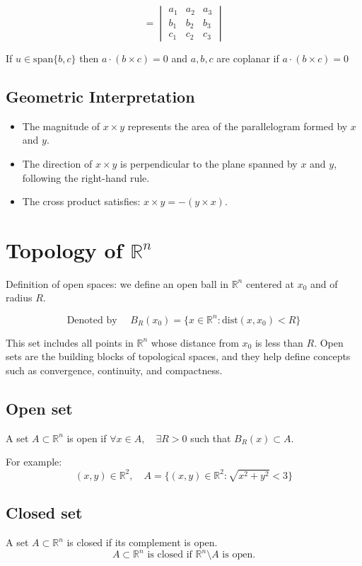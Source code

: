 \documentclass[11pt]{article}
\begin{document}
\[
= \begin{vmatrix}
a_1 & a_2 & a_3 \\
b_1 & b_2 & b_3 \\
c_1 & c_2 & c_3
\end{vmatrix}
\]

If $u \in \text{span}\{b, c\}$ then $a \cdot (b \times c) = 0$ and $a, b, c$ are coplanar if $a \cdot (b \times c) = 0$

\subsection{Geometric Interpretation}
\begin{itemize}
    \item The magnitude of $x \times y$ represents the area of the parallelogram formed by $x$ and $y$.
    \item The direction of $x \times y$ is perpendicular to the plane spanned by $x$ and $y$, following the right-hand rule.
    \item The cross product satisfies: $x \times y = - (y \times x)$.
\end{itemize}

\section{Topology of $\mathbb{R}^n$}

Definition of open spaces: we define an open ball in $\mathbb{R}^n$ centered at $x_0$ and of radius $R$.

\[
\text{Denoted by } \quad B_R(x_0) = \{ x \in \mathbb{R}^n : \text{dist}(x, x_0) < R \}
\]

This set includes all points in $\mathbb{R}^n$ whose distance from $x_0$ is less than $R$. Open sets are the building blocks of topological spaces, and they help define concepts such as convergence, continuity, and compactness.

\subsection{Open set}
A set $A \subset \mathbb{R}^n$ is open if $\forall x \in A, \quad \exists R > 0$ such that $B_R(x) \subset A$.

For example:
\[
(x,y) \in \mathbb{R}^2, \quad A = \{ (x,y) \in \mathbb{R}^2 : \sqrt{x^2 + y^2} < 3 \}
\]

\subsection{Closed set}
A set $A \subset \mathbb{R}^n$ is closed if its complement is open.
\[
A \subset \mathbb{R}^n \text{ is closed if } \mathbb{R}^n \setminus A \text{ is open.}
\]
\end{document}
